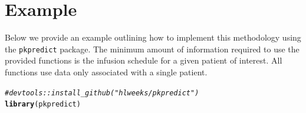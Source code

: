 \documentclass{article}\usepackage[]{graphicx}\usepackage[]{color}
\makeatletter
\newcommand{\hlcom}[1]{\textcolor[rgb]{0.678,0.584,0.686}{\textit{#1}}}%
\newcommand{\hlstd}[1]{\textcolor[rgb]{0.345,0.345,0.345}{#1}}%
\newcommand{\hlkwd}[1]{\textcolor[rgb]{0.737,0.353,0.396}{\textbf{#1}}}%
\newenvironment{kframe}{%
 \def\at@end@of@kframe{}%
 \ifinner\ifhmode%
  \def\at@end@of@kframe{\end{minipage}}%
  \begin{minipage}{\columnwidth}%
 \fi\fi%
 \def\FrameCommand##1{\hskip\@totalleftmargin \hskip-\fboxsep
 \colorbox{shadecolor}{##1}\hskip-\fboxsep
     \hskip-\linewidth \hskip-\@totalleftmargin \hskip\columnwidth}%
 \MakeFramed {\advance\hsize-\width
   \@totalleftmargin\z@ \linewidth\hsize
   \@setminipage}}%
 {\par\unskip\endMakeFramed%
 \at@end@of@kframe}
\newenvironment{knitrout}{}{} %
\makeatother
\begin{document}




%


\section{Example}

Below we provide an example outlining how to implement this methodology using the \texttt{pkpredict} package. The minimum amount of information required to use the provided functions is the infusion schedule for a given patient of interest. All functions use data only associated with a single patient.


\begin{knitrout}
\color{fgcolor}\begin{kframe}
\begin{alltt}
\hlcom{# devtools::install_github("hlweeks/pkpredict")}
\hlkwd{library}\hlstd{(pkpredict)}
\end{alltt}
\end{kframe}
\end{knitrout}
\end{document}
